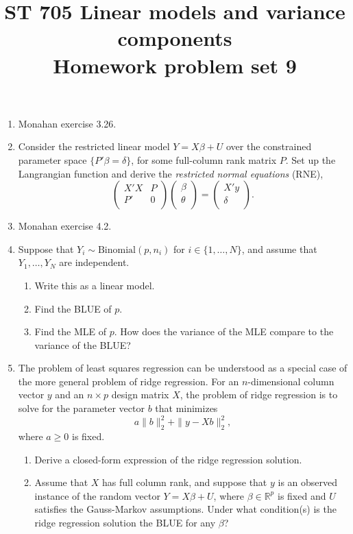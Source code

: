 \documentclass[11pt]{article}
\title{ST 705 Linear models and variance components \\ 
        Homework problem set 9}
\begin{document}
\maketitle

\begin{enumerate}

\item Monahan exercise 3.26.

\item Consider the restricted linear model $Y = X\beta + U$ over the constrained parameter space $\{P'\beta = \delta\}$, for some full-column rank matrix $P$.  Set up the Langrangian function and derive the {\em restricted normal equations} (RNE),
\[
\begin{pmatrix}
X'X & P \\
P' & 0 \\
\end{pmatrix}
\begin{pmatrix}
\beta \\
\theta \\
\end{pmatrix} = 
\begin{pmatrix}
X'y \\
\delta \\
\end{pmatrix}.
\]

\item Monahan exercise 4.2.

\item Suppose that $Y_{i} \sim \text{Binomial}(p,n_{i})$ for $i \in \{1,\dots,N\}$, and assume that $Y_{1},\dots,Y_{N}$ are independent.
\begin{enumerate}
\item Write this as a linear model.
\item Find the BLUE of $p$.
\item Find the MLE of $p$.  How does the variance of the MLE compare to the variance of the BLUE?
\end{enumerate}

\item The problem of least squares regression can be understood as a special case of the more general problem of ridge regression.  For an $n$-dimensional column vector $y$ and an $n\times p$ design matrix $X$, the problem of ridge regression is to solve for the parameter vector $b$ that minimizes
\[
a\|b\|_{2}^{2} + \|y - Xb\|_{2}^{2},
\]
where $a \ge 0$ is fixed.
\begin{enumerate}
\item Derive a closed-form expression of the ridge regression solution.
\item Assume that $X$ has full column rank, and suppose that $y$ is an observed instance of the random vector $Y = X\beta + U$, where $\beta \in \mathbb{R}^{p}$ is fixed and $U$ satisfies the Gauss-Markov assumptions.  Under what condition(s) is the ridge regression solution the BLUE for any $\beta$?
\end{enumerate}


\end{enumerate}
\end{document}
